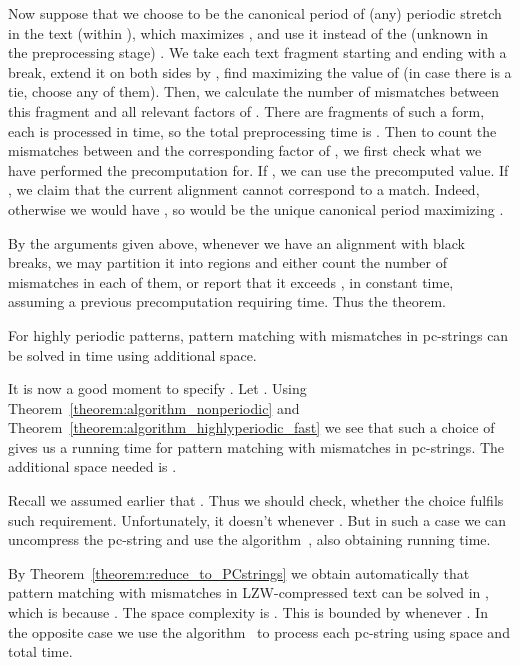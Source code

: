 \documentclass[runningheads]{llncs}
\begin{document}
\begin{mycases}[listparindent=15pt]
Now suppose that we choose  to be the canonical period of (any) periodic stretch in the text (within ), which maximizes , and use it instead of the (unknown in the preprocessing stage) . We take each text fragment starting and ending with a break, extend it on both sides by , find  maximizing the value of  (in case there is a tie, choose any of them). Then, we calculate the number of mismatches between this fragment and all  relevant factors of . There are  fragments of such a form, each is processed in  time, so the total preprocessing time is . Then to count the mismatches between  and the corresponding factor of , we first check what  we have performed the precomputation for. If , we can use the precomputed value.
If , we claim that the current alignment cannot correspond to a match. Indeed, otherwise we would have , so  would be the unique canonical period maximizing .
\end{mycases}

By the arguments given above, whenever we have an alignment with  black breaks, we may partition it into  regions and either count the number of mismatches in each of them, or report that it exceeds , in constant time, assuming a previous precomputation requiring  time. Thus the theorem.

\begin{theorem}\label{theorem:algorithm_highlyperiodic_fast}
For highly periodic patterns, pattern matching with  mismatches in pc-strings can be solved in  time using  additional space.
\end{theorem}

It is now a good moment to specify . Let . Using Theorem~\ref{theorem:algorithm_nonperiodic} and Theorem~\ref{theorem:algorithm_highlyperiodic_fast} we see that such a choice of  gives us a running time  for pattern matching with  mismatches in pc-strings. The additional space needed is .

\begin{remark}
Recall we assumed earlier that . Thus we should check, whether the choice  fulfils such requirement. Unfortunately, it doesn't whenever . But in such a case we can uncompress the pc-string and use the  algorithm~\cite{LandauMismatches}, also obtaining  running time.
\end{remark}

By Theorem~\ref{theorem:reduce_to_PCstrings} we obtain automatically that pattern matching with  mismatches in LZW-compressed text can be solved in , which is  because . The space complexity is . This is bounded by  whenever . In the opposite case we use the  algorithm~\cite{LandauMismatches} to process each pc-string using
 space and  total time.
\end{document}
